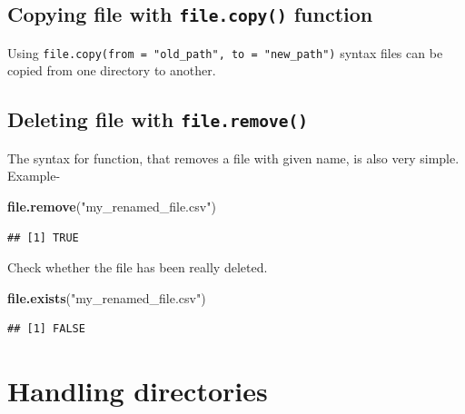 \documentclass[
]{book}
\newenvironment{Shaded}{\begin{snugshade}}{\end{snugshade}}
\newcommand{\FunctionTok}[1]{\textcolor[rgb]{0.13,0.29,0.53}{\textbf{#1}}}
\newcommand{\NormalTok}[1]{#1}
\newcommand{\StringTok}[1]{\textcolor[rgb]{0.31,0.60,0.02}{#1}}
\begin{document}
\hypertarget{copying-file-with-file.copy-function}{%
\subsection{\texorpdfstring{Copying file with \texttt{file.copy()} function}{Copying file with file.copy() function}}\label{copying-file-with-file.copy-function}}

Using \texttt{file.copy(from\ =\ "old\_path",\ to\ =\ "new\_path")} syntax  files can be copied from one directory to another.

\hypertarget{deleting-file-with-file.remove}{%
\subsection{\texorpdfstring{Deleting file with \texttt{file.remove()}}{Deleting file with file.remove()}}\label{deleting-file-with-file.remove}}

The syntax for function, that removes a file with given name, is also very simple. Example-

\begin{Shaded}
\begin{Highlighting}[]
\FunctionTok{file.remove}\NormalTok{(}\StringTok{"my\_renamed\_file.csv"}\NormalTok{)}
\end{Highlighting}
\end{Shaded}

\begin{verbatim}
## [1] TRUE
\end{verbatim}

Check whether the file has been really deleted.

\begin{Shaded}
\begin{Highlighting}[]
\FunctionTok{file.exists}\NormalTok{(}\StringTok{"my\_renamed\_file.csv"}\NormalTok{)}
\end{Highlighting}
\end{Shaded}

\begin{verbatim}
## [1] FALSE
\end{verbatim}

\hypertarget{handling-directories}{%
\section{Handling directories}\label{handling-directories}}
\end{document}
